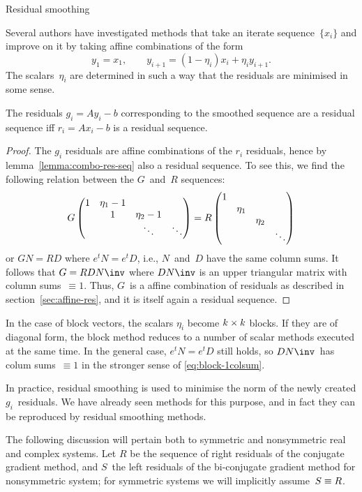 \documentclass[11pt]{artikel3}
\begin{document}
\begin{Outline}
 {Residual smoothing}
\label{sec:smoothing}

Several authors 
\cite{Sch:scientific-vector,We:convergence-cg,ZhWa:residual-smoothing}
have investigated methods that take an iterate sequence~$\{x_i\}$
and improve on it by taking affine combinations of the form
\[ y_1 = x_1,\qquad y_{i+1} = (1-\eta_i)x_i+\eta_iy_{i+1}. \]
The scalars~$\eta_i$ are determined in such a way that the residuals
are minimised in some sense.

\begin{lemma}
The residuals $g_i=Ay_i-b$ corresponding to the smoothed sequence
are a residual sequence iff $r_i=Ax_i-b$ is a residual sequence.
\end{lemma}
\begin{proof}
The $g_i$ residuals are affine combinations of the $r_i$ residuals,
hence by lemma~\ref{lemma:combo-res-seq} also a residual sequence.
To see this,
we find the following relation between the $G$~and~$R$ sequences:
\[ G\begin{pmatrix}1&\eta_1-1\cr &1&\eta_2-1\cr &&\ddots&\ddots\cr\end{pmatrix}
        = R\begin{pmatrix}1\cr &\eta_1\cr &&\eta_2\cr&&&\ddots\end{pmatrix} \]
or $GN=RD$ where $e^tN=e^tD$, i.e., $N$~and~$D$ have the same
column sums. 
It follows that $G=RDN\inv$ where $DN\inv$ is an upper triangular
matrix with column sums~${}\equiv1$. Thus, $G$~is a affine combination
of residuals as described in section~\ref{sec:affine-res}, and
it is itself again a residual sequence.\end{proof}

\begin{block}
In the case of block vectors, the scalars $\eta_i$ become
$k\times\nobreak k$ blocks.
If they are of diagonal form, the block method reduces to a number of
scalar methods executed at the same time.
In the general case, $e^tN=e^tD$ still holds, so $DN\inv$~has 
colum sums~${}\equiv1$ in the stronger sense of \eqref{eq:block-1colsum}.
\end{block}

In practice, residual smoothing is used to minimise the
norm of the newly created $g_i$~residuals. We have already seen
methods for this purpose, and in fact they can be reproduced by
residual smoothing methods.

The following discussion will pertain both to symmetric and nonsymmetric
real and complex systems.
Let $R$ be the sequence of right residuals of the conjugate
gradient method, and $S$~the left residuals of the bi-conjugate
gradient method for nonsymmetric system; for symmetric systems
we will implicitly assume~$S\equiv\nobreak R$.


\end{Outline}
\end{document}
